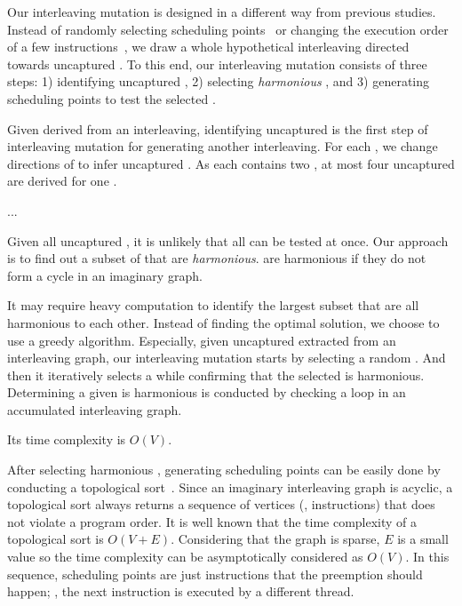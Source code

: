 
Our interleaving mutation is designed in a different way from previous
studies.
% 
Instead of randomly selecting scheduling points~\cite{krace, ski} or
changing the execution order of a few instructions~\cite{razzer,
  snowboard}, we draw a whole hypothetical interleaving directed
towards uncaptured \segments.
%
To this end, our interleaving mutation consists of three steps:
%
1) identifying uncaptured \segments, 2) selecting \textit{harmonious}
\segments, and 3) generating scheduling points to test the selected
\segments.

%
Given \segments derived from an interleaving, identifying uncaptured
\segments is the first step of interleaving mutation for generating
another interleaving.
%
For each \segment, we change directions of \mutables to infer
uncaptured \segments.
%
As each \segment contains two \mutables, at most four uncaptured
\segments are derived for one \segment.

...






%
Given all uncaptured \segments, it is unlikely that all \segments can
be tested at once.
%
Our approach is to find out a subset of \segments that are
\textit{harmonious}. \Segments are harmonious if they do not form a
cycle in an imaginary graph.


It may require heavy computation to identify the largest subset that
are all harmonious to each other.
%
Instead of finding the optimal solution, we choose to use a greedy
algorithm.
%
Especially, given uncaptured \segments extracted from an interleaving
graph, our interleaving mutation starts by selecting a random
\segment.
%
And then it iteratively selects a \segment while confirming that the
selected \segment is harmonious.
%
Determining a given \segment is harmonious is conducted by checking a
loop in an accumulated interleaving graph.

Its time complexity is $O(V)$.


%
After selecting harmonious \segments, generating scheduling points can
be easily done by conducting a topological
sort~\cite{topologicalsort}.
%
Since an imaginary interleaving graph is acyclic, a topological sort
always returns a sequence of vertices (\ie, instructions) that does
not violate a program order.
%
It is well known that the time complexity of a topological sort is
$O(V+E)$. Considering that the graph is sparse, $E$ is a small value
so the time complexity can be asymptotically considered as $O(V)$.
%
In this sequence, scheduling points are just instructions that the
preemption should happen; \ie, the next instruction is executed by a
different thread.
%





